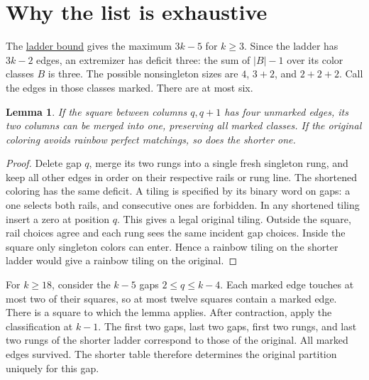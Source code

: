 \documentclass[11pt]{article}
\newtheorem{lemma}[theorem]{Lemma}
\newcommand{\repo}{https://github.com/Akhil-rav/discrete-math-lab}
\begin{document}
\newpage
\section{Why the list is exhaustive}
The \href{\repo/blob/main/notes/matching_covers.md}{ladder bound} gives the
maximum \(3k-5\) for \(k\ge3\). Since the ladder has \(3k-2\) edges,
an extremizer has deficit three: the sum of \(|B|-1\) over its color
classes \(B\) is three. The possible nonsingleton sizes are \(4\), \(3+2\),
and \(2+2+2\). Call the edges in those classes marked. There are at most six.

\begin{lemma}
If the square between columns \(q,q+1\) has four unmarked edges, its two
columns can be merged into one, preserving all marked classes. If the
original coloring avoids rainbow perfect matchings, so does the shorter one.
\end{lemma}
\begin{proof}
Delete gap \(q\), merge its two rungs into a single fresh singleton rung,
and keep all other edges in order on their respective rails or rung line.
The shortened coloring has the same deficit. A tiling is specified by its
binary word on gaps: a one selects both rails, and consecutive ones are
forbidden. In any shortened tiling insert a zero at position \(q\).
This gives a legal original tiling. Outside the square, rail choices agree
and each rung sees the same incident gap choices. Inside the square only
singleton colors can enter. Hence a rainbow tiling on the shorter ladder
would give a rainbow tiling on the original.
\end{proof}
For \(k\ge18\), consider the \(k-5\) gaps \(2\le q\le k-4\).
Each marked edge touches at most two of their squares, so at most twelve
squares contain a marked edge. There is a square to which the lemma applies.
After contraction, apply the classification at \(k-1\). The first two gaps,
last two gaps, first two rungs, and last two rungs of the shorter ladder
correspond to those of the original. All marked edges survived. The shorter
table therefore determines the original partition uniquely for this gap.
\end{document}
